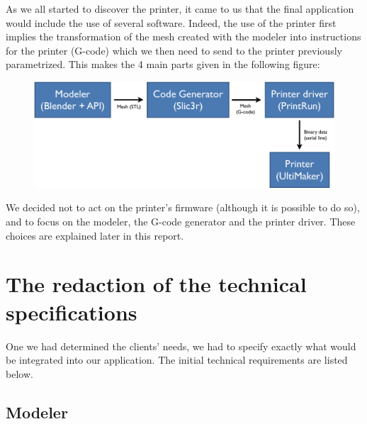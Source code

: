 \documentclass{report}
\begin{document}
As we all started to discover the printer, it came to us that the final application would include the use of several software. Indeed, the use of the printer first implies the transformation of the mesh created with the modeler into instructions for the printer (G-code) which we then need to send to the printer previously parametrized. This makes the 4 main parts given in the following figure:

\bigskip

\begin{figure}[!h]

\begin{center}
	\includegraphics[width=.7\textwidth]{schema}
\end{center}

\end{figure}

We decided not to act on the printer's firmware (although it is possible to do so), and to focus on the modeler, the G-code generator and the printer driver. These choices are explained later in this report. 

\section{The redaction of the technical specifications}

One we had determined the clients' needs, we had to specify exactly what would be integrated into our application. The initial technical requirements are listed below.

\subsection{Modeler}

\bigskip
\end{document}
